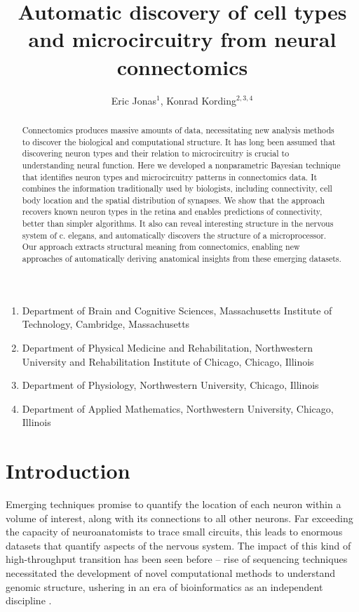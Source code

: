 \documentclass{nature}
\title{Automatic discovery of cell types and microcircuitry from neural connectomics}
\author{Eric Jonas$^1$, Konrad Kording$^{2, 3,4}$}
\begin{document}
\maketitle

\begin{small}
\begin{enumerate}
  \item Department of Brain and Cognitive Sciences, Massachusetts Institute of Technology, Cambridge, Massachusetts
  \item Department of Physical Medicine and Rehabilitation, Northwestern University and Rehabilitation Institute of Chicago, Chicago, Illinois
  \item Department of Physiology, Northwestern University, Chicago, Illinois
  \item Department of Applied Mathematics, Northwestern University, Chicago, Illinois
\end{enumerate}
\end{small}

\begin{abstract}
  Connectomics produces massive amounts of data,
  necessitating new analysis methods to discover the biological and
  computational structure. It has long been assumed
  that discovering neuron types and their relation to microcircuitry is crucial to
  understanding neural function. Here we developed a nonparametric
  Bayesian technique that identifies neuron types and microcircuitry
  patterns in connectomics data. It combines the information traditionally used by biologists, including connectivity, cell body location and the spatial distribution of synapses.  We show that the approach recovers known neuron types in the retina and enables predictions of connectivity, better than simpler algorithms. It also can reveal interesting structure in
  the nervous system of c. elegans, and automatically discovers the
  structure of a microprocessor. 
 Our approach extracts structural meaning from connectomics, enabling new approaches of automatically deriving  anatomical insights from these emerging datasets.
\end{abstract}


\section*{Introduction}
Emerging techniques \autocite{Morgan2013,Zador2012} promise to
quantify the location of each neuron within a volume of interest,
along with its connections to all other neurons. Far exceeding the
capacity of neuroanatomists to trace small circuits, this leads to
enormous datasets that quantify aspects of the nervous system. The impact of
this kind of high-throughput transition has been seen before -- 
rise of sequencing techniques necessitated the
development of novel computational methods to understand genomic
structure, ushering in an era of bioinformatics as an independent
discipline \autocite{Koboldt2013}.
\end{document}
